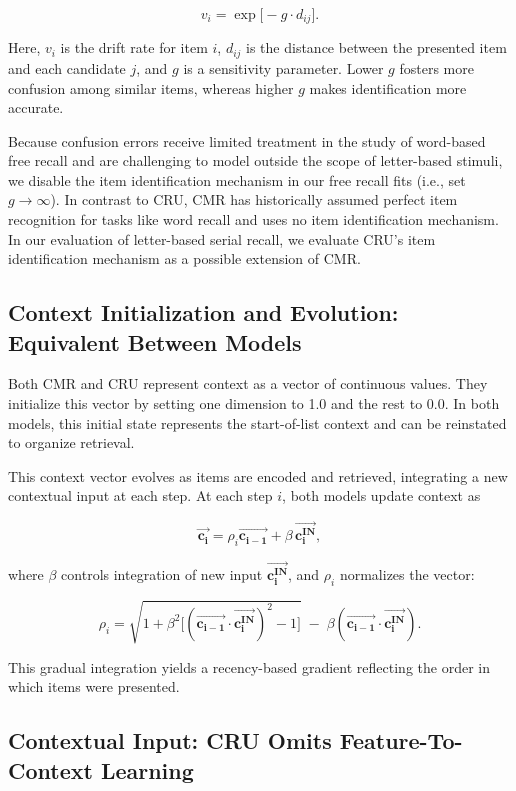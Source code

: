 \documentclass[
  letterpaper,
  11pt,
  english,
  singlespacing,
  headsepline]{MastersDoctoralThesis}
\begin{document}
\[
v_i = \exp \bigl[-g \cdot d_{ij}\bigr].
\]

Here, \(v_i\) is the drift rate for item \(i\), \(d_{ij}\) is the
distance between the presented item and each candidate \(j\), and \(g\)
is a sensitivity parameter. Lower \(g\) fosters more confusion among
similar items, whereas higher \(g\) makes identification more accurate.

Because confusion errors receive limited treatment in the study of
word-based free recall and are challenging to model outside the scope of
letter-based stimuli, we disable the item identification mechanism in
our free recall fits (i.e., set \(g \rightarrow \infty\)). In contrast
to CRU, CMR has historically assumed perfect item recognition for tasks
like word recall and uses no item identification mechanism. In our
evaluation of letter-based serial recall, we evaluate CRU's item
identification mechanism as a possible extension of CMR.

\subsection{Context Initialization and Evolution: Equivalent Between
Models}\label{context-initialization-and-evolution-equivalent-between-models}

Both CMR and CRU represent context as a vector of continuous values.
They initialize this vector by setting one dimension to 1.0 and the rest
to 0.0. In both models, this initial state represents the start-of-list
context and can be reinstated to organize retrieval.

This context vector evolves as items are encoded and retrieved,
integrating a new contextual input at each step. At each step \(i\),
both models update context as

\[
\mathbf{\vec{c_i}} = \rho_i \mathbf{\vec{c_{i-1}}} + \beta \, \mathbf{\vec{c_{i}^{\text{IN}}}},
\]

where \(\beta\) controls integration of new input
\(\mathbf{\vec{c_i^{IN}}}\), and \(\rho_i\) normalizes the vector:

\[
\rho_i = \sqrt{1 + \beta^2\bigl[(\mathbf{\vec{c_{i-1}}} \cdot \mathbf{\vec{c^{IN}_i}})^2 - 1\bigr]} \;-\;\beta(\mathbf{\vec{c_{i-1}}} \cdot \mathbf{\vec{c^{IN}_i}}).
\]

This gradual integration yields a recency-based gradient reflecting the
order in which items were presented.

\subsection{Contextual Input: CRU Omits Feature-To-Context
Learning}\label{contextual-input-cru-omits-feature-to-context-learning}
\end{document}
